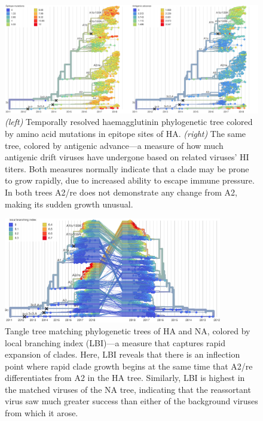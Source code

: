 \begin{figure}[h]
    \begin{center}
    \includegraphics[width=\textwidth]{figures/epi_aa_trees_high_res.png}
    \end{center}
    \caption{\textit{(left)} Temporally resolved haemagglutinin phylogenetic tree colored by amino acid mutations in epitope sites \cite{Wolf2006} of HA. \textit{(right)} The same tree, colored by antigenic advance---a measure of how much antigenic drift viruses have undergone based on related viruses' HI titers. Both measures normally indicate that a clade may be prone to grow rapidly, due to increased ability to escape immune pressure. In both trees A2/re does not demonstrate any change from A2, making its sudden growth unusual.}
    \label{sup_fig:epitope_aa}
\end{figure}

\begin{figure}[b]
    \begin{center}
    \includegraphics[width=0.85\textwidth]{figures/ha_na_lbi_high_res.png}
    \end{center}
    \caption{Tangle tree matching phylogenetic trees of HA and NA, colored by local branching index (LBI)---a measure that captures rapid expansion of clades. Here, LBI reveals that there is an inflection point where rapid clade growth begins at the same time that A2/re differentiates from A2 in the HA tree. Similarly, LBI is highest in the matched viruses of the NA tree, indicating that the reassortant virus saw much greater success than either of the background viruses from which it arose.}
    \label{sup_fig:lbi}
\end{figure}

